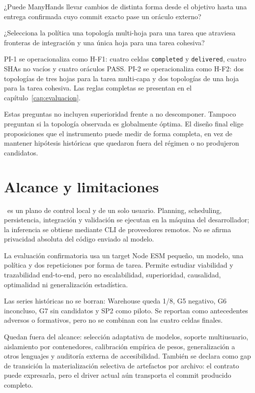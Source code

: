 \begin{description}[leftmargin=2.2cm,style=nextline]
  \item[\textbf{PI-1}] ¿Puede ManyHands llevar cambios de distinta forma desde
  el objetivo hasta una entrega confirmada cuyo commit exacto pase un oráculo
  externo?
  \item[\textbf{PI-2}] ¿Selecciona la política una topología multi-hoja para una
  tarea que atraviesa fronteras de integración y una única hoja para una tarea
  cohesiva?
\end{description}

PI-1 se operacionaliza como H-F1: cuatro celdas \texttt{completed} y
\texttt{delivered}, cuatro SHAs no vacíos y cuatro oráculos PASS. PI-2 se
operacionaliza como H-F2: dos topologías de tres hojas para la tarea multi-capa
y dos topologías de una hoja para la tarea cohesiva. Las reglas completas se
presentan en el capítulo~\ref{cap:evaluacion}.

Estas preguntas no incluyen superioridad frente a no descomponer. Tampoco
preguntan si la topología observada es globalmente óptima. El diseño final elige
proposiciones que el instrumento puede medir de forma completa, en vez de
mantener hipótesis históricas que quedaron fuera del régimen o no produjeron
candidatos.

\section{Alcance y limitaciones}

\sistema\ es un plano de control local y de un solo usuario. Planning,
scheduling, persistencia, integración y validación se ejecutan en la máquina del
desarrollador; la inferencia se obtiene mediante CLI de proveedores remotos. No
se afirma privacidad absoluta del código enviado al modelo.

La evaluación confirmatoria usa un target Node ESM pequeño, un modelo, una
política y dos repeticiones por forma de tarea. Permite estudiar viabilidad y
trazabilidad end-to-end, pero no escalabilidad, superioridad, causalidad,
optimalidad ni generalización estadística.

Las series históricas no se borran: Warehouse queda 1/8, G5 negativo, G6
inconcluso, G7 sin candidatos y SP2 como piloto. Se reportan como antecedentes
adversos o formativos, pero no se combinan con las cuatro celdas finales.

Quedan fuera del alcance: selección adaptativa de modelos, soporte multiusuario,
aislamiento por contenedores, calibración empírica de pesos, generalización a
otros lenguajes y auditoría externa de accesibilidad. También se declara como
gap de transición la materialización selectiva de artefactos por archivo: el
contrato puede expresarla, pero el driver actual aún transporta el commit
producido completo.
